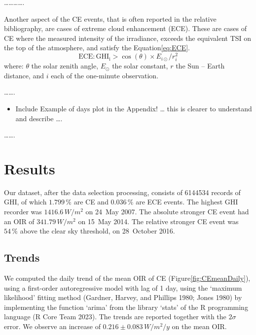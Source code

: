 \documentclass[
  preprint, 3p, authoryear]{article}
\providecommand{\tightlist}{%
  \setlength{\itemsep}{0pt}\setlength{\parskip}{0pt}}
\begin{document}
\ldots\ldots\ldots\ldots.

Another aspect of the CE events, that is often reported in the relative bibliography,
are cases of extreme cloud enhancement (ECE). These are cases of CE where the
measured intensity of the irradiance, exceeds the equivalent TSI on the top of the
atmosphere, and satisfy the Equation\nobreakspace{}\ref{eq:ECE}.
\begin{equation}
\text{ECE}: \text{GHI}_\text{i} > \cos(\theta) \times E_{i\odot} / r_{i}^2
\label{eq:ECE}
\end{equation}
where: \(\theta\) the solar zenith angle, \(E_{\odot}\) the solar constant, \(r\) the Sun -- Earth distance, and \(i\) each of the one-minute observation.

\ldots\ldots.

\begin{itemize}
\tightlist
\item
  Include Example of days plot in the Appendix!
  \ldots{} this is clearer to understand and describe \ldots.
\end{itemize}

\ldots\ldots.

\hypertarget{results}{%
\section{Results}\label{results}}

Our dataset, after the data selection processing, consists of
6144534 records of GHI, of which
\(1.799\,\%\) are CE and
\(0.036\,\%\) are ECE events.
The highest GHI recorder was
\(1416.6\,W/m^2\)
on 24~May 2007.
The absolute stronger CE event had an OIR of
\(341.79\,W/m^2\) on
15~May 2014.
The relative stronger CE event was
\(54\,\%\) above the
clear sky threshold, on
28~October 2016.

\hypertarget{trends}{%
\subsection{Trends}\label{trends}}

We computed the daily trend of the mean OIR of CE
(Figure\nobreakspace{}\ref{fig:CEmeanDaily}), using a first-order autoregressive
model with lag of 1 day, using the `maximum likelihood' fitting method (Gardner, Harvey, and Phillips 1980; Jones 1980) by implementing the function `arima' from the library `stats' of the R
programming language (R Core Team 2023). The trends are reported together with the \(2\sigma\)
error. We observe an increase of
\(0.216\pm 0.083\,W/m^2/y\)
on the mean OIR.
\end{document}
